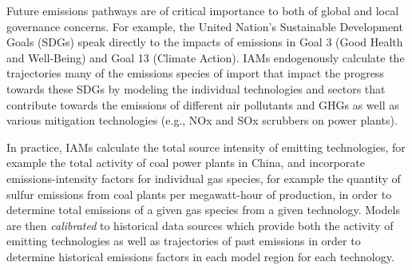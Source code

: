 Future emissions pathways are of critical importance to both of global and local
% 
% 
% 
% 
% 
governance concerns. For example, the United Nation's Sustainable Development
Goals (SDGs)  speak directly to the impacts of emissions in Goal 3
(Good Health and Well-Being) and Goal 13 (Climate Action). IAMs endogenously
calculate the trajectories many of the emissions species of import that impact
the progress towards these SDGs by modeling the individual technologies and
sectors that contribute towards the emissions of different air pollutants and
GHGs as well as various mitigation technologies (e.g., NOx and SOx scrubbers on
power plants).

In practice, IAMs calculate the total source intensity of emitting technologies,
for example the total activity of coal power plants in China, and incorporate
emissions-intensity factors for individual gas species, for example the quantity
of sulfur emissions from coal plants per megawatt-hour of production, in order
to determine total emissions of a given gas species from a given
technology. Models are then \textit{calibrated} to historical data sources which
provide both the activity of emitting technologies as well as trajectories of
past emissions in order to determine historical emissions factors in each model
region for each technology.

